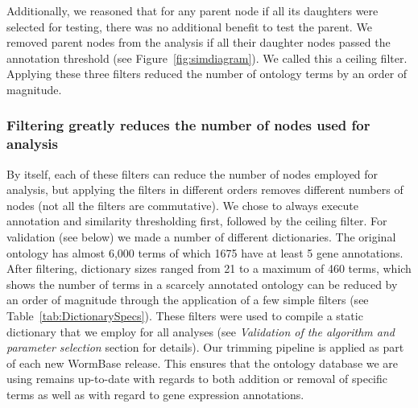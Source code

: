 Additionally, we reasoned that for any parent node if all its daughters were
selected for testing, there was no additional benefit to test the parent. We
removed parent nodes from the analysis if all their daughter nodes passed the
annotation threshold (see Figure~\ref{fig:simdiagram}). We called this a ceiling
filter. Applying these three filters reduced the number of ontology terms by an
order of magnitude.

\subsubsection*{Filtering greatly reduces the number of nodes used for analysis}
By itself, each of these filters can reduce the number of nodes employed for
analysis, but applying the filters in different orders removes different numbers
of nodes (not all the filters are commutative). We chose to always execute
annotation and similarity thresholding first, followed by the ceiling filter.
For validation (see below) we made a number of different dictionaries. The
original ontology has almost 6,000 terms of which 1675 have at least 5 gene
annotations. After filtering, dictionary sizes ranged from 21 to a maximum of
460 terms, which shows the number of terms in a scarcely annotated ontology can
be reduced by an order of magnitude through the application of a few simple
filters (see Table~\ref{tab:DictionarySpecs}). These filters were used to compile
a static dictionary that we employ for all analyses (see \emph{Validation of the
algorithm and parameter selection} section for details). Our trimming pipeline is
applied as part of each new WormBase release. This ensures that the ontology
database we are using remains up-to-date with regards to both addition or removal
of specific terms as well as with regard to gene expression annotations.

